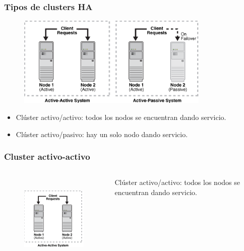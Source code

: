 \documentclass{beamer}
\begin{document}
\begin{frame}
\frametitle{Tipos de clusters HA}

\begin{figure}[h]

\begin{center}
  \centering
  \includegraphics[height=1.7in]{figs/clusters2.png}
\end{center}
\end{figure}

	\begin{itemize}
	\item \alert{Clúster activo/activo}: todos los nodos se encuentran dando servicio.
	\item \alert{Clúster activo/pasivo}: hay un solo nodo dando servicio.
	\end{itemize}

\end{frame}



\begin{frame}
\frametitle{Cluster activo-activo}

\begin{columns}

\column[t]{4cm}

\begin{figure}[h]

\begin{center}
  \centering
  \includegraphics[height=1.7in]{figs/active-cluster.png}
\end{center}
\end{figure}


\column[t]{5cm}
\vspace{2cm}

\alert{Clúster activo/activo}: todos los nodos se encuentran dando servicio.

\end{columns}


\end{frame}
\end{document}
